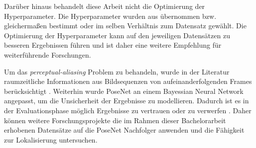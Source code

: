 Darüber hinaus behandelt diese Arbeit nicht die Optimierung der Hyperparameter. Die Hyperparameter wurden aus \citet{acharyaBIMPoseNetIndoorCamera2019} übernommen bzw. gleichermaßen bestimmt oder im selben Verhältnis zum Datensatz gewählt. Die Optimierung der Hyperparameter kann auf den jeweiligen Datensätzen zu besseren Ergebnissen führen und ist daher eine weitere Empfehlung für weiterführende Forschungen. 

Um das \textit{perceptual-aliasing} Problem zu behandeln, wurde in der Literatur raumzeitliche Informationen aus Bildsequenzen von aufeinanderfolgenden Frames berücksichtigt \cite{walchImageBasedLocalizationUsing2017, clarkVidLocDeepSpatioTemporal2017}. Weiterhin wurde PoseNet an einem Bayessian Neural Network angepasst, um die Unsicherheit der Ergebnisse zu modellieren. Dadurch ist es in der Evaluationsphase möglich Ergebnisse zu vertrauen oder zu verwerfen \cite{kendallModellingUncertaintyDeep2016}. Daher können weitere Forschungsprojekte die im Rahmen dieser Bachelorarbeit erhobenen Datensätze auf die PoseNet Nachfolger \cite{kendallModellingUncertaintyDeep2016, walchImageBasedLocalizationUsing2017, clarkVidLocDeepSpatioTemporal2017} anwenden und die Fähigkeit zur Lokalisierung untersuchen.